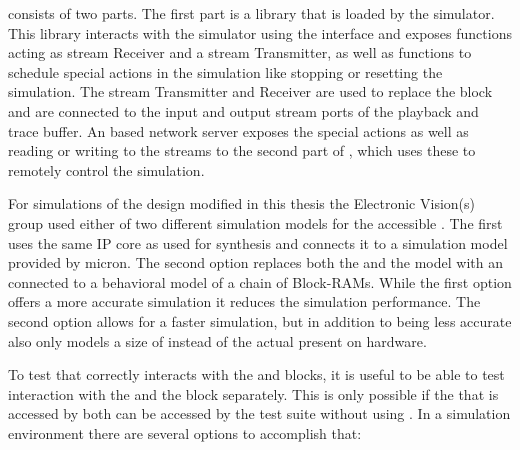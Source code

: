 \flange{} consists of two parts. The first part is a library that is loaded by the simulator. This library interacts with the simulator using the \DPI{} interface and exposes functions acting as stream Receiver and a stream Transmitter, as well as functions to schedule special actions in the simulation like stopping or resetting the simulation. The stream Transmitter and Receiver are used to replace the \HostARQ{} block and are connected to the input and output stream ports of the playback and trace buffer. An \RCF{}\autocite{ref:rcf} based network server exposes the special actions as well as reading or writing to the streams to the second part of \flange{}, which uses these to remotely control the simulation.

For simulations of the \FPGA{} design modified in this thesis the Electronic Vision(s) group used either of two different simulation models for the \AXI{} accessible \DRAM{}. The first uses the same \Xilinx \MIG{} IP core as used for synthesis and connects it to a \DDR{} simulation model provided by micron\autocite{ref:ddr3Model}. The second option replaces both the \MIG{} and the \DDR{} model with an \AXIBRAMController{} connected to a behavioral model of a chain of Block-RAMs. While the first option offers a more accurate simulation it reduces the simulation performance. The second option allows for a faster simulation, but in addition to being less accurate also only models a size of \SIMMEMSIZE{} instead of the actual \DDRSIZE{} present on hardware.

To test that \ayo{} correctly interacts with the \FAXI{} and \AXIDMA{} blocks, it is useful to be able to test interaction with the \FAXI{} and the \AXIDMA{} block separately. This is only possible if the \DRAM{} that is accessed by both can be accessed by the test suite without using \FAXI{}. In a simulation environment there are several options to accomplish that:

